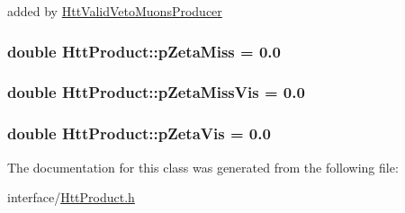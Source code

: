 added by \hyperlink{classHttValidVetoMuonsProducer}{HttValidVetoMuonsProducer} \hypertarget{classHttProduct_a75672ea51e6fd225c866ade315ba0982}{
\subsubsection[{pZetaMiss}]{\setlength{\rightskip}{0pt plus 5cm}double {\bf HttProduct::pZetaMiss} = 0.0}}
\label{classHttProduct_a75672ea51e6fd225c866ade315ba0982}
\hypertarget{classHttProduct_abba102385ce7747d70c597409670aad8}{
\subsubsection[{pZetaMissVis}]{\setlength{\rightskip}{0pt plus 5cm}double {\bf HttProduct::pZetaMissVis} = 0.0}}
\label{classHttProduct_abba102385ce7747d70c597409670aad8}
\hypertarget{classHttProduct_afc00696a0a2e05df1472fa9023b8ce57}{
\subsubsection[{pZetaVis}]{\setlength{\rightskip}{0pt plus 5cm}double {\bf HttProduct::pZetaVis} = 0.0}}
\label{classHttProduct_afc00696a0a2e05df1472fa9023b8ce57}


The documentation for this class was generated from the following file:\begin{DoxyCompactItemize}
\item 
interface/\hyperlink{HttProduct_8h}{HttProduct.h}\end{DoxyCompactItemize}
